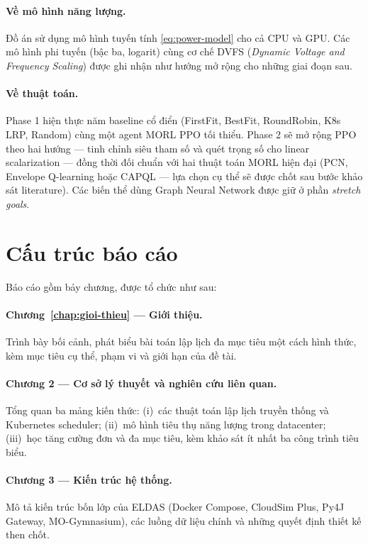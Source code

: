 \paragraph{Về mô hình năng lượng.}
Đồ án sử dụng mô hình tuyến tính \eqref{eq:power-model} cho cả CPU và
GPU. Các mô hình phi tuyến (bậc ba, logarit) cùng cơ chế DVFS
(\textit{Dynamic Voltage and Frequency Scaling}) được ghi nhận như hướng
mở rộng cho những giai đoạn sau.

\paragraph{Về thuật toán.}
Phase 1 hiện thực năm baseline cổ điển (FirstFit, BestFit, RoundRobin,
K8s LRP, Random) cùng một agent MORL PPO tối thiểu. Phase 2 sẽ mở rộng
PPO theo hai hướng --- tinh chỉnh siêu tham số và quét trọng số cho
linear scalarization --- đồng thời đối chuẩn với hai thuật toán MORL
hiện đại (PCN, Envelope Q-learning hoặc CAPQL --- lựa chọn cụ thể sẽ
được chốt sau bước khảo sát literature). Các biến thể dùng Graph Neural
Network được giữ ở phần \textit{stretch goals}.

\section{Cấu trúc báo cáo}
\label{sec:cau-truc}

Báo cáo gồm bảy chương, được tổ chức như sau:

\paragraph{Chương~\ref{chap:gioi-thieu} --- Giới thiệu.}
Trình bày bối cảnh, phát biểu bài toán lập lịch đa mục tiêu một cách hình
thức, kèm mục tiêu cụ thể, phạm vi và giới hạn của đề tài.

\paragraph{Chương 2 --- Cơ sở lý thuyết và nghiên cứu liên quan.}
Tổng quan ba mảng kiến thức: (i)~các thuật toán lập lịch truyền thống và
Kubernetes scheduler; (ii)~mô hình tiêu thụ năng lượng trong datacenter;
(iii)~học tăng cường đơn và đa mục tiêu, kèm khảo sát ít nhất ba công
trình tiêu biểu.

\paragraph{Chương 3 --- Kiến trúc hệ thống.}
Mô tả kiến trúc bốn lớp của ELDAS (Docker Compose, CloudSim Plus, Py4J
Gateway, MO-Gymnasium), các luồng dữ liệu chính và những quyết định
thiết kế then chốt.


